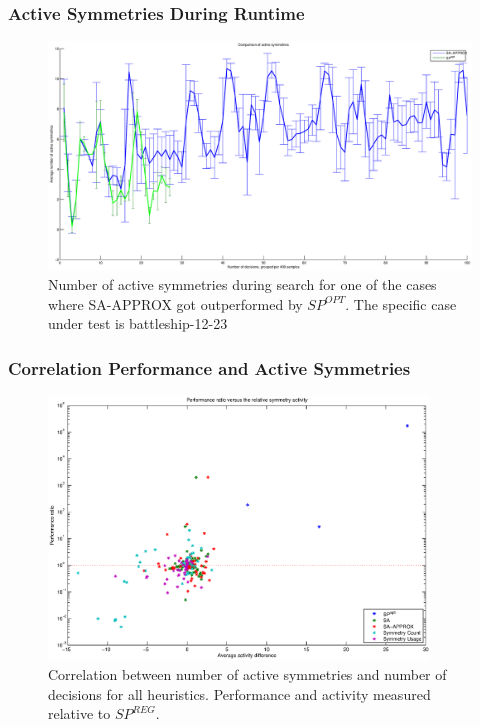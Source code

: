 \documentclass{beamer}
\begin{document}
	\begin{frame}[plain]
		\frametitle{Active Symmetries During Runtime}
		\begin{figure}
			\centerline{\includegraphics[width=1.2\textwidth]{../results/battleship-12-23-approx-vs-reg.eps}}
			\caption{
				Number of active symmetries during search for one of the cases where SA-APPROX got
				outperformed by $SP^{OPT}$.
				The specific case under test is battleship-12-23
			}
			\label{fig:active_symmetries_during_search}
		\end{figure}
	\end{frame}
	
	\begin{frame}[plain]
		\frametitle{Correlation Performance and Active Symmetries}
		\begin{figure}
			\center
			\centerline{\includegraphics[width=0.9\textwidth]{../results/scatterplot_activity.eps}}
			\caption{
				Correlation between number of active symmetries and number of decisions for all
				heuristics.
				Performance and activity measured relative to $SP^{REG}$.
			}
			\label{fig:correlation}
		\end{figure}
	\end{frame}
	
\end{document}
